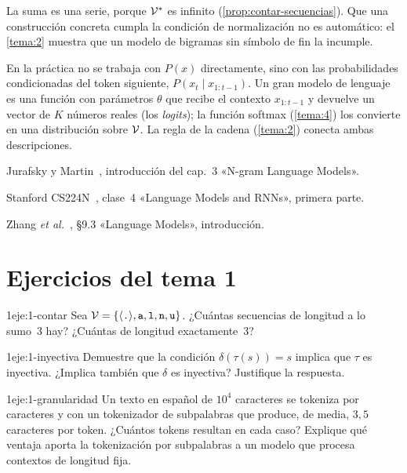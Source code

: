 La suma es una serie, porque $\mathcal{V}^{*}$ es infinito (\cref{prop:contar-secuencias}). Que una construcción concreta cumpla la condición de normalización no es automático: el \cref{tema:2} muestra que un modelo de bigramas sin símbolo de fin la incumple.

\begin{observacion}
En la práctica no se trabaja con $P(x)$ directamente, sino con las probabilidades condicionadas del token siguiente, $P(x_t\mid x_{1:t-1})$. Un gran modelo de lenguaje es una función con parámetros $\theta$ que recibe el contexto $x_{1:t-1}$ y devuelve un vector de $K$ números reales (los \emph{logits}); la función softmax (\cref{tema:4}) los convierte en una distribución sobre $\mathcal{V}$. La regla de la cadena (\cref{tema:2}) conecta ambas descripciones.
\end{observacion}

\begin{lecturas}
\item Jurafsky y Martin~\cite{jm3}, introducción del cap.~3 «N-gram Language Models».
\item Stanford CS224N~\cite{cs224n}, clase~4 «Language Models and RNNs», primera parte.
\item Zhang \emph{et al.}~\cite{d2l}, §9.3 «Language Models», introducción.
\end{lecturas}

\section*{Ejercicios del tema 1}

\begin{ejercicio}{1}{eje:1-contar}
Sea $\mathcal{V}=\{\langle\texttt{.}\rangle,\texttt{a},\texttt{l},\texttt{n},\texttt{u}\}$. ¿Cuántas secuencias de longitud a lo sumo~3 hay? ¿Cuántas de longitud exactamente~3?
\end{ejercicio}

\begin{ejercicio}{1}{eje:1-inyectiva}
Demuestre que la condición $\delta(\tau(s))=s$ implica que $\tau$ es inyectiva. ¿Implica también que $\delta$ es inyectiva? Justifique la respuesta.
\end{ejercicio}

\begin{ejercicio}{1}{eje:1-granularidad}
Un texto en español de $10^{4}$ caracteres se tokeniza por caracteres y con un tokenizador de subpalabras que produce, de media, $3{,}5$ caracteres por token. ¿Cuántos tokens resultan en cada caso? Explique qué ventaja aporta la tokenización por subpalabras a un modelo que procesa contextos de longitud fija.
\end{ejercicio}

